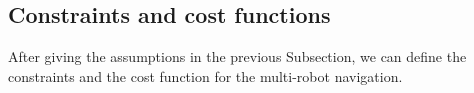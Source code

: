 \documentclass[eprint]{actapoly}
\begin{document}
\begin{enumerate}

%    

\end{enumerate}

\subsection{Constraints and cost functions}

After giving the assumptions in the previous Subsection,
we can define the constraints and the cost function for the
multi-robot navigation.
\end{document}
